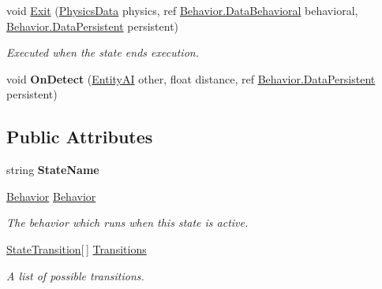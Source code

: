\begin{DoxyCompactItemize}
\item 
void \hyperlink{class_skyrates_1_1_a_i_1_1_state_1_1_state_a707956b07fa8604f268ae83f657085b1}{Exit} (\hyperlink{class_skyrates_1_1_physics_1_1_physics_data}{Physics\-Data} physics, ref \hyperlink{class_skyrates_1_1_a_i_1_1_behavior_1_1_data_behavioral}{Behavior.\-Data\-Behavioral} behavioral, \hyperlink{class_skyrates_1_1_a_i_1_1_behavior_1_1_data_persistent}{Behavior.\-Data\-Persistent} persistent)
\begin{DoxyCompactList}\small\item\em Executed when the state ends execution. \end{DoxyCompactList}\item 
\hypertarget{class_skyrates_1_1_a_i_1_1_state_1_1_state_a26df125ad49ed38b293a75fb6326f93f}{void {\bfseries On\-Detect} (\hyperlink{class_skyrates_1_1_entity_1_1_entity_a_i}{Entity\-A\-I} other, float distance, ref \hyperlink{class_skyrates_1_1_a_i_1_1_behavior_1_1_data_persistent}{Behavior.\-Data\-Persistent} persistent)}\label{class_skyrates_1_1_a_i_1_1_state_1_1_state_a26df125ad49ed38b293a75fb6326f93f}

\end{DoxyCompactItemize}
\subsection*{Public Attributes}
\begin{DoxyCompactItemize}
\item 
\hypertarget{class_skyrates_1_1_a_i_1_1_state_1_1_state_ae3258cfad9d2da7ac6f7fa90bc4da102}{string {\bfseries State\-Name}}\label{class_skyrates_1_1_a_i_1_1_state_1_1_state_ae3258cfad9d2da7ac6f7fa90bc4da102}

\item 
\hyperlink{class_skyrates_1_1_a_i_1_1_behavior}{Behavior} \hyperlink{class_skyrates_1_1_a_i_1_1_state_1_1_state_ab9057a99beb495631ab4ddada1bce031}{Behavior}
\begin{DoxyCompactList}\small\item\em The behavior which runs when this state is active. \end{DoxyCompactList}\item 
\hyperlink{class_skyrates_1_1_a_i_1_1_state_1_1_state_transition}{State\-Transition}\mbox{[}$\,$\mbox{]} \hyperlink{class_skyrates_1_1_a_i_1_1_state_1_1_state_a58cac0e774a7a26577f98bb12093cf41}{Transitions}
\begin{DoxyCompactList}\small\item\em A list of possible transitions. \end{DoxyCompactList}\end{DoxyCompactItemize}


